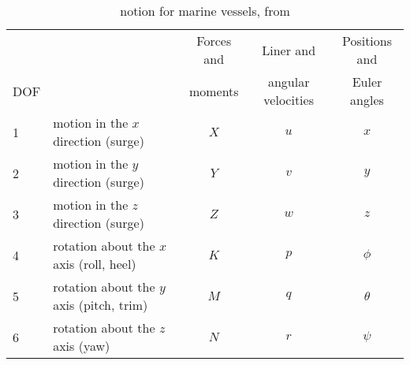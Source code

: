 \begin{table}[htbp]
	\centering
	\begin{tabular}{llccc}
		\toprule
		    & & Forces and & Liner and          & Positions and  \\
		DOF & & moments    & angular velocities & Euler angles   \\ 
		\midrule
		1 & motion in the $x$ direction (surge)       & $X$ & $u$ & $x$ \\
		2 & motion in the $y$ direction (surge)       & $Y$ & $v$ & $y$ \\
		3 & motion in the $z$ direction (surge)       & $Z$ & $w$ & $z$ \\
		4 & rotation about the $x$ axis (roll, heel)  & $K$ & $p$ & $\phi$ \\
		5 & rotation about the $y$ axis (pitch, trim) & $M$ & $q$ & $\theta$ \\
		6 & rotation about the $z$ axis (yaw)         & $N$ & $r$ & $\psi$ \\
		\bottomrule
	\end{tabular}
	\caption{\cite{sname1950} notion for marine vessels, from
	\citep[table~2.1]{fossen}}
	\label{tab:sname}
\end{table}

